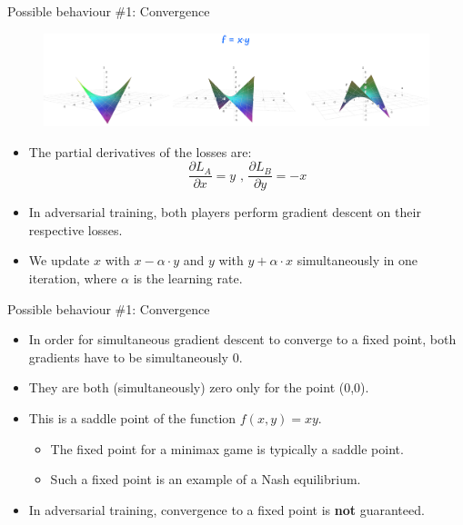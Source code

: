     
\begin{frame} {Possible behaviour \#1: Convergence}
  \begin{figure}
    \centering
     {\includegraphics{plots/adv_xy.png}}
  \end{figure}
  \begin{itemize}
    \item The partial derivatives of the losses are:
     \begin{equation*}
       \frac {\partial{L_{A}}}{\partial x} = y \text{ , }
       \frac {\partial{L_{B}}}{\partial y} = -x
     \end{equation*}
    \item In adversarial training, both players perform gradient descent on their respective losses.
    \item %
    We update $x$ with $x - \alpha \cdot y$ and $y$ with $y + \alpha \cdot x$ simultaneously in one iteration, where $\alpha$ is the learning rate.
  \end{itemize}
\end{frame}

\begin{frame} {Possible behaviour \#1: Convergence}
  \begin{figure}
    \centering
  \end{figure}
  \begin{itemize}
    \item In order for simultaneous gradient descent to converge to a fixed point, both gradients have to be simultaneously 0.
    \item They are both (simultaneously) zero only for the point (0,0).
    \item This is a saddle point of the function $f(x,y) = xy$.
    \begin{itemize}
       \item The fixed point for a minimax game is typically a saddle point.
      \item Such a fixed point is an example of a Nash equilibrium.
    \end{itemize}
    \item In adversarial training, convergence to a fixed point is \textbf{not} guaranteed.
  \end{itemize}
\end{frame}

